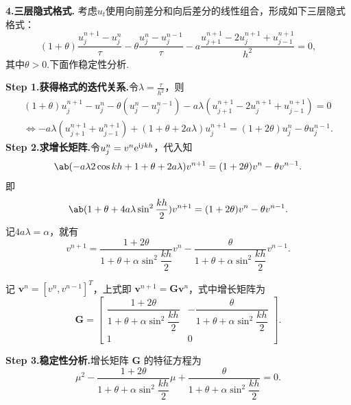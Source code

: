\noindent\textbf{4.三层隐式格式.} 考虑$u_t$使用向前差分和向后差分的线性组合，形成如下三层隐式格式：
    \begin{equation*}
        (1+\theta)\frac{u_j^{n+1} - u_j^n}{\tau}-\theta \frac{u_j^n - u_j^{n-1}}{\tau} - a \frac{u_{j+1}^{n+1} - 2u_j^{n+1} + u_{j-1}^{n+1}}{h^2} = 0,
    \end{equation*}
其中$\theta>0$.下面作稳定性分析.\par
\noindent\textbf{Step 1.获得格式的迭代关系.}令$\lambda=\frac{\tau}{h^2}$，则
    \begin{gather*}
        (1+\theta){u_j^{n+1} - u_j^n}-\theta({u_j^n - u_j^{n-1}}) - a\lambda (u_{j+1}^{n+1} - 2u_j^{n+1} + u_{j-1}^{n+1}) = 0 \\
        \Leftrightarrow - a\lambda(u_{j+1}^{n+1} + u_{j-1}^{n+1})+(1+\theta+2a\lambda)u_j^{n+1}= (1+2\theta) u_j^n - \theta  u_j^{n-1}.
    \end{gather*}
\noindent\textbf{Step 2.求增长矩阵.}令$u_j^n=v^n\mathrm{e}^{\mathrm{i} jkh}$，代入知
\begin{equation*}
    \ab(-a\lambda2\cos kh + 1 + \theta + 2a\lambda) v^{n+1} = (1 + 2\theta) v^n - \theta v^{n-1}.
\end{equation*}
即
\begin{equation*}
    \ab(1+\theta+4a\lambda\sin^2 \frac{kh}{2}) v^{n+1} = (1 + 2\theta) v^n - \theta v^{n-1}.
\end{equation*}
记$4a\lambda=\alpha$，就有
\begin{equation*}
    v^{n+1}=\frac{1+2\theta}{1+\theta+\alpha\sin^2 \dfrac{kh}{2}} v^n - \frac{\theta}{1+\theta+\alpha\sin^2 \dfrac{kh}{2}} v^{n-1}.
\end{equation*}\par
记 $\bm{v}^n = [v^n, v^{n-1}]^T$，上式即 $\bm{v}^{n+1} = \bm{G}\bm{v}^n$，式中增长矩阵为
\begin{equation*}
    \bm{G} = \begin{bmatrix}
        \dfrac{1+2\theta}{1+\theta+\alpha\sin^2 \dfrac{kh}{2}} & -\dfrac{\theta}{1+\theta+\alpha\sin^2 \dfrac{kh}{2}} \\
        1 & 0
    \end{bmatrix}.
\end{equation*}

\noindent\textbf{Step 3.稳定性分析.}增长矩阵 $\bm{G}$ 的特征方程为
\begin{equation*}
    \mu^2 - \frac{1+2\theta}{1+\theta+\alpha\sin^2 \dfrac{kh}{2}} \mu + \frac{\theta}{1+\theta+\alpha\sin^2 \dfrac{kh}{2}} = 0.
\end{equation*}

